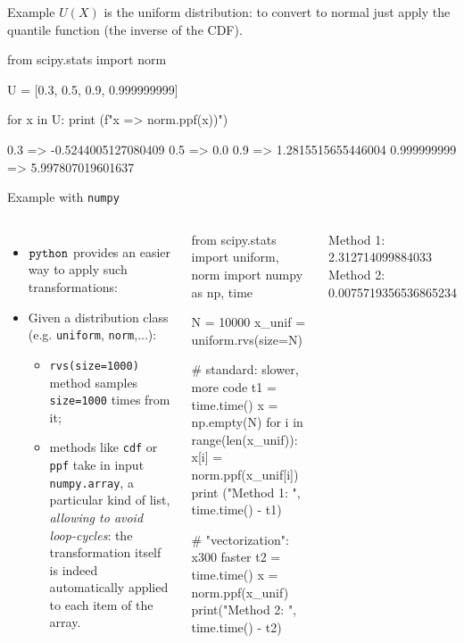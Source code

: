 \documentclass{beamer}
\begin{document}
\begin{frame}[fragile]{Example}
  $U(X)$ is the uniform distribution: to convert to normal just apply the quantile function (the inverse of the CDF).
  \begin{ipython}
from scipy.stats import norm

U = [0.3, 0.5, 0.9, 0.999999999]

for x in U:
    print (f"{x} => {norm.ppf(x))}")
  \end{ipython}
\begin{ioutput}
0.3 => -0.5244005127080409
0.5 => 0.0
0.9 => 1.2815515655446004
0.999999999 => 5.997807019601637
\end{ioutput}
\end{frame}
	
\begin{frame}[fragile]{Example with \texttt{numpy}}
  \begin{columns}
    \begin{itemize}	
    \item $\tt{python}$ provides an easier way to apply such transformations:
    \item  Given a distribution class (e.g. \texttt{uniform}, \texttt{norm},...):
      \begin{itemize}
      \item \texttt{rvs(size=1000)} method samples \texttt{size=1000} times from it;
      \item methods like \texttt{cdf} or \texttt{ppf} take in input \texttt{numpy.array},  a particular kind of list, \emph{allowing to avoid loop-cycles}: the transformation itself is indeed automatically applied to each item of the array.
      \end{itemize}
    \end{itemize}
\tiny{
    \begin{ipython}
from scipy.stats import uniform, norm
import numpy as np, time

N = 10000
x_unif = uniform.rvs(size=N)

# standard: slower, more code
t1 = time.time()
x = np.empty(N)
for i in range(len(x_unif)):
  x[i] = norm.ppf(x_unif[i])
print ("Method 1: ", time.time() - t1)

# "vectorization": ~ x300 faster
t2 = time.time()
x = norm.ppf(x_unif)
print("Method 2: ", time.time() - t2)      
\end{ipython}
\begin{ioutput}
Method 1: 2.312714099884033
Method 2: 0.0075719356536865234
\end{ioutput}
    }
    \end{columns}
\end{frame}
\end{document}
